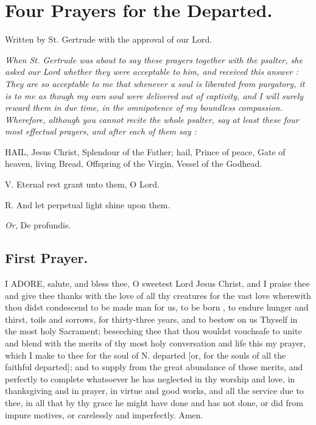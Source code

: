 \documentclass[a5paper,12pt]{memoir}
\begin{document}
\section{Four Prayers for the Departed.} 

Written by St. Gertrude with the approval 
of our Lord. 

\emph{When St. Gertrude 
was about to say these 
prayers together with the 
psalter, she asked our 
Lord whether they were 
acceptable to him, and 
received this answer : 
They are so acceptable 
to me that whenever a 
soul is liberated from 
purgatory, it is to me as 
though my own soul 
were delivered out of 
captivity, and I will 
surely reward them in 
due time, in the omnipotence of my boundless compassion. Wherefore, although you cannot recite the whole psalter, say at least these 
four most effectual prayers, and after each of 
them say :} 

HAIL, Jesus Christ, 
Splendour of the 
Father; hail, Prince of 
peace, Gate of heaven, 
living Bread, Offspring 
of the Virgin, Vessel 
of the Godhead. 

V. Eternal rest 
grant unto them, O 
Lord. 

R. And let perpetual light shine upon 
them. 

\emph{Or,} De profundis. 

\subsection{First Prayer.} 

I ADORE, salute, and 
bless thee, O sweetest Lord Jesus Christ, 
and I praise thee and 
give thee thanks with 
the love of all thy creatures for the vast love 
wherewith thou didst 
condescend to be made 
man for us, to be born , 
to endure hunger and 
thirst, toils and sorrows, for thirty-three 
years, and to bestow 
on us Thyself in the 
most holy Sacrament; 
beseeching thee that 
thou wouldst vouchsafe to unite and blend 
with the merits of thy 
most holy conversation and life this my 
prayer, which I make 
to thee for the soul of 
N. departed [or, for 
the souls of all the 
faithful departed]; 
and to supply from 
the great abundance 
of those merits, and 
perfectly to complete 
whatsoever he has neglected in thy worship 
and love, in thanksgiving and in prayer, 
in virtue and good 
works, and all the service due to thee, in all 
that by thy grace he 
might have done and 
has not done, or did 
from impure motives, 
or carelessly and imperfectly. Amen. 
\end{document}
